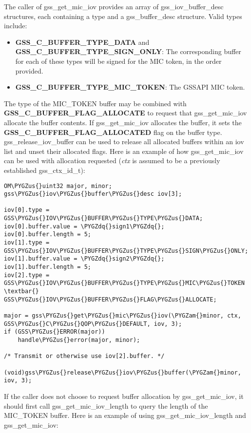 \documentclass[letterpaper,10pt,english]{sphinxmanual}
\def\PYGZus{\char`\_}
\def\PYGZam{\char`\&}
\def\PYGZdq{\char`\"}
\begin{document}
The caller of gss\_get\_mic\_iov provides an array of gss\_iov\_buffer\_desc
structures, each containing a type and a gss\_buffer\_desc structure.
Valid types include:
\begin{itemize}
\item {} 
\textbf{GSS\_C\_BUFFER\_TYPE\_DATA} and \textbf{GSS\_C\_BUFFER\_TYPE\_SIGN\_ONLY}: The
corresponding buffer for each of these types will be signed for the
MIC token, in the order provided.

\item {} 
\textbf{GSS\_C\_BUFFER\_TYPE\_MIC\_TOKEN}: The GSSAPI MIC token.

\end{itemize}

The type of the MIC\_TOKEN buffer may be combined with
\textbf{GSS\_C\_BUFFER\_FLAG\_ALLOCATE} to request that gss\_get\_mic\_iov
allocate the buffer contents.  If gss\_get\_mic\_iov allocates the
buffer, it sets the \textbf{GSS\_C\_BUFFER\_FLAG\_ALLOCATED} flag on the buffer
type.  gss\_release\_iov\_buffer can be used to release all allocated
buffers within an iov list and unset their allocated flags.  Here is
an example of how gss\_get\_mic\_iov can be used with allocation
requested (\emph{ctx} is assumed to be a previously established
gss\_ctx\_id\_t):

\begin{Verbatim}[commandchars=\\\{\}]
OM\PYGZus{}uint32 major, minor;
gss\PYGZus{}iov\PYGZus{}buffer\PYGZus{}desc iov[3];

iov[0].type = GSS\PYGZus{}IOV\PYGZus{}BUFFER\PYGZus{}TYPE\PYGZus{}DATA;
iov[0].buffer.value = \PYGZdq{}sign1\PYGZdq{};
iov[0].buffer.length = 5;
iov[1].type = GSS\PYGZus{}IOV\PYGZus{}BUFFER\PYGZus{}TYPE\PYGZus{}SIGN\PYGZus{}ONLY;
iov[1].buffer.value = \PYGZdq{}sign2\PYGZdq{};
iov[1].buffer.length = 5;
iov[2].type = GSS\PYGZus{}IOV\PYGZus{}BUFFER\PYGZus{}TYPE\PYGZus{}MIC\PYGZus{}TOKEN \textbar{} GSS\PYGZus{}IOV\PYGZus{}BUFFER\PYGZus{}FLAG\PYGZus{}ALLOCATE;

major = gss\PYGZus{}get\PYGZus{}mic\PYGZus{}iov(\PYGZam{}minor, ctx, GSS\PYGZus{}C\PYGZus{}QOP\PYGZus{}DEFAULT, iov, 3);
if (GSS\PYGZus{}ERROR(major))
    handle\PYGZus{}error(major, minor);

/* Transmit or otherwise use iov[2].buffer. */

(void)gss\PYGZus{}release\PYGZus{}iov\PYGZus{}buffer(\PYGZam{}minor, iov, 3);
\end{Verbatim}

If the caller does not choose to request buffer allocation by
gss\_get\_mic\_iov, it should first call gss\_get\_mic\_iov\_length to query
the length of the MIC\_TOKEN buffer.  Here is an example of using
gss\_get\_mic\_iov\_length and gss\_get\_mic\_iov:
\end{document}
